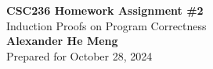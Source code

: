 \begin{titlepage}
    \null %
    \vfill
    \begin{center}
        {\fontsize{40}{48}\selectfont \bfseries CSC236 Homework Assignment \#2}
        \vspace{20pt} \\
        {\LARGE Induction Proofs on Program Correctness} \\
        \vspace{20pt}
        \textbf{Alexander He Meng}
        \vspace{8pt}
        \\ Prepared for October 28, 2024
    \end{center}
    \vfill
\end{titlepage}

